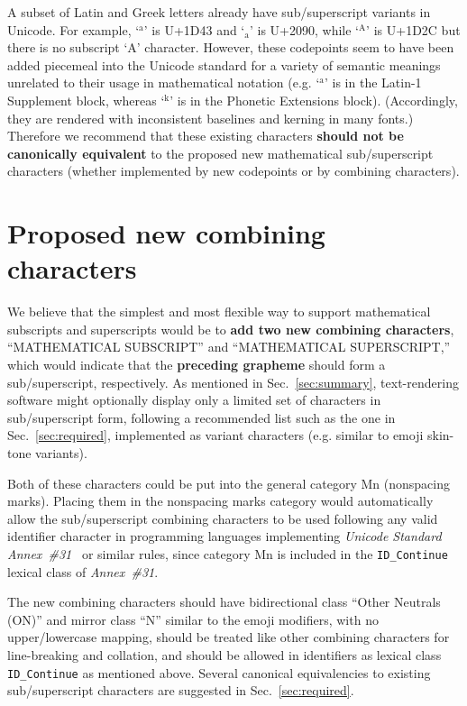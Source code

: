 \documentclass[10pt,english]{article}
\newcommand{\secref}[1]{Sec.~\ref{sec:#1}}
\begin{document}
A subset of Latin and Greek letters already have sub/superscript variants in Unicode.  For example, `$^\mathrm{a}$' is U+1D43 and `$_\mathrm{a}$' is U+2090, while `$^\mathrm{A}$' is U+1D2C but there is no subscript `A' character.   However, these codepoints seem to have been added piecemeal into the Unicode standard for a variety of semantic meanings unrelated to their usage in mathematical notation (e.g. `$^\mathrm{a}$' is in the Latin-1 Supplement block, whereas `$^\mathrm{k}$' is in the Phonetic Extensions block).  (Accordingly, they are rendered with inconsistent baselines and kerning in many fonts.) Therefore we recommend that these existing characters \textbf{should not be canonically equivalent} to the proposed new mathematical sub/superscript characters (whether implemented by new codepoints or by combining characters).

\section{Proposed new combining characters}

We believe that the simplest and most flexible way to support mathematical subscripts and superscripts would be to \textbf{add two new combining characters}, ``MATHEMATICAL SUBSCRIPT'' and ``MATHEMATICAL SUPERSCRIPT,'' which would indicate that the \textbf{preceding grapheme} should form a sub/superscript, respectively.   As mentioned in \secref{summary}, text-rendering software might optionally display only a limited set of characters in sub/superscript form, following a recommended list such as the one in \secref{required}, implemented as variant characters (e.g. similar to emoji skin-tone variants).

Both of these characters could be put into the general category Mn (nonspacing marks). Placing them in the nonspacing marks category would automatically allow the sub/superscript combining characters to be used following any valid identifier character in programming languages implementing \emph{Unicode Standard Annex~\#31}~\cite{UAX31} or similar rules, since category Mn is included in the \texttt{ID\_Continue} lexical class of \emph{Annex~\#31}.

The new combining characters should have bidirectional class ``Other Neutrals (ON)'' and mirror class ``N'' similar to the emoji modifiers, with no upper/lowercase mapping, should be treated like other combining characters for line-breaking and collation, and should be allowed in identifiers as lexical class \texttt{ID\_Continue} as mentioned above.   Several  canonical equivalencies to existing sub/superscript characters are suggested in \secref{required}.
\end{document}
